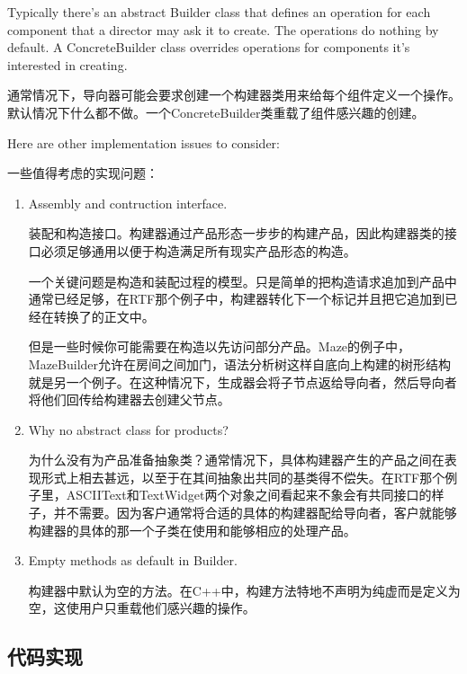 Typically there's an abstract Builder class that defines an operation for each component that a director may ask it to create. The operations do nothing by default. A ConcreteBuilder class overrides operations for components it's interested in creating.

通常情况下，导向器可能会要求创建一个构建器类用来给每个组件定义一个操作。默认情况下什么都不做。一个ConcreteBuilder类重载了组件感兴趣的创建。

Here are other implementation issues to consider:

一些值得考虑的实现问题：

\begin{enumerate}

\item Assembly and contruction interface.

	  装配和构造接口。构建器通过产品形态一步步的构建产品，因此构建器类的接口必须足够通用以便于构造满足所有现实产品形态的构造。

	  一个关键问题是构造和装配过程的模型。只是简单的把构造请求追加到产品中通常已经足够，在RTF那个例子中，构建器转化下一个标记并且把它追加到已经在转换了的正文中。

	  但是一些时候你可能需要在构造以先访问部分产品。Maze的例子中，MazeBuilder允许在房间之间加门，语法分析树这样自底向上构建的树形结构就是另一个例子。在这种情况下，生成器会将子节点返给导向者，然后导向者将他们回传给构建器去创建父节点。

\item Why no abstract class for products?

	  为什么没有为产品准备抽象类？通常情况下，具体构建器产生的产品之间在表现形式上相去甚远，以至于在其间抽象出共同的基类得不偿失。在RTF那个例子里，ASCIIText和TextWidget两个对象之间看起来不象会有共同接口的样子，并不需要。因为客户通常将合适的具体的构建器配给导向者，客户就能够构建器的具体的那一个子类在使用和能够相应的处理产品。

\item Empty methods as default in Builder.

      构建器中默认为空的方法。在C++中，构建方法特地不声明为纯虚而是定义为空，这使用户只重载他们感兴趣的操作。

\end{enumerate}

\subsection{代码实现}


